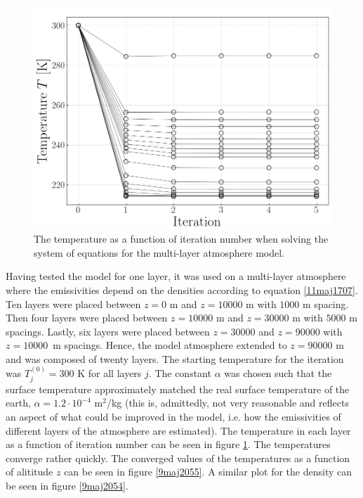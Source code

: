 \documentclass[twocolumn]{article}
\begin{document}
\begin{large}
\begin{figure}[!t]
\begin{center}
        \includegraphics[scale=0.35]{Iteration.png}
    \end{center}
    \caption{The temperature as a function of iteration number when solving the system of equations for the multi-layer atmosphere model.}
    \label{9maj2056}
\end{figure}

Having tested the model for one layer, it was used on a multi-layer atmosphere where the emissivities depend on the densities according to equation \eqref{11maj1707}. Ten layers were placed between $z=0$ m and $z=10000$ m with $1000$ m spacing. Then four layers were placed between $z=10000$ m and $z=30000$ m with $5000$ m spacings. Lastly, six layers were placed between $z=30000$ and $z=90000$ with \mbox{$z=10000$ m} spacings. Hence, the model atmosphere extended to $z=90000$ m and was composed of twenty layers. The starting temperature for the iteration was $T_j^{(0)}=300$ K for all layers $j$. The constant $\alpha$ was chosen such that the surface temperature approximately matched the real surface temperature of the earth, $\alpha=1.2\cdot 10^{-4}$ m$^{2}$/kg (this is, admittedly, not very reasonable and reflects an aspect of what could be improved in the model, i.e. how the emissivities of different layers of the atmosphere are estimated). The temperature in each layer as a function of iteration number can be seen in figure \ref{9maj2056}. The temperatures converge rather quickly. The converged values of the temperatures as a function of alititude $z$ can be seen in figure \ref{9maj2055}. A similar plot for the density can be seen in figure \ref{9maj2054}. 


\end{large}
\end{document}
